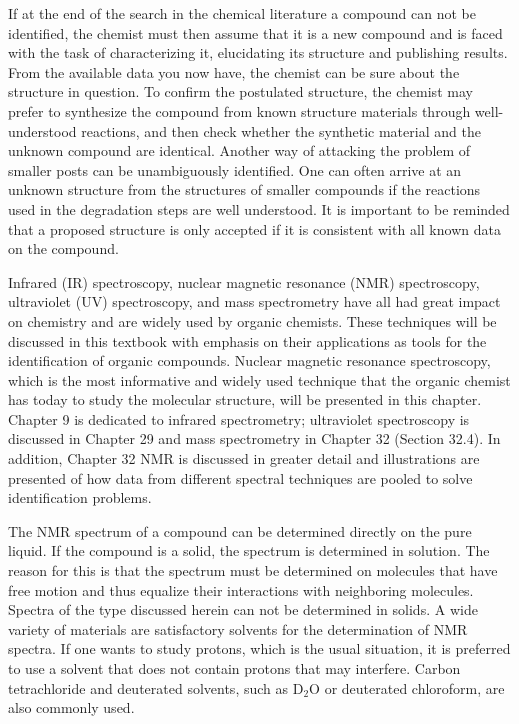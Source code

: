 If at the end of the search in the chemical literature a compound can not be identified, the chemist must then assume that it is a new compound and is faced with the task of characterizing it, elucidating its structure and publishing results. From the available data you now have, the chemist can be sure about the structure in question. To confirm the postulated structure, the chemist may prefer to synthesize the compound from known structure materials through well-understood reactions, and then check whether the synthetic material and the unknown compound are identical. Another way of attacking the problem of smaller posts can be unambiguously identified. One can often arrive at an unknown structure from the structures of smaller compounds if the reactions used in the degradation steps are well understood. It is important to be reminded that a proposed structure is only accepted if it is consistent with all known data on the compound.

Infrared (IR) spectroscopy, nuclear magnetic resonance (NMR) spectroscopy, ultraviolet (UV) spectroscopy, and mass spectrometry have all had great impact on chemistry and are widely used by organic chemists. These techniques will be discussed in this textbook with emphasis on their applications as tools for the identification of organic compounds. Nuclear magnetic resonance spectroscopy, which is the most informative and widely used technique that the organic chemist has today to study the molecular structure, will be presented in this chapter. Chapter 9 is dedicated to infrared spectrometry; ultraviolet spectroscopy is discussed in Chapter 29 and mass spectrometry in Chapter 32 (Section 32.4). In addition, Chapter 32 NMR is discussed in greater detail and illustrations are presented of how data from different spectral techniques are pooled to solve identification problems.

The NMR spectrum of a compound can be determined directly on the pure liquid. If the compound is a solid, the spectrum is determined in solution. The reason for this is that the spectrum must be determined on molecules that have free motion and thus equalize their interactions with neighboring molecules. Spectra of the type discussed herein can not be determined in solids. A wide variety of materials are satisfactory solvents for the determination of NMR spectra. If one wants to study protons, which is the usual situation, it is preferred to use a solvent that does not contain protons that may interfere. Carbon tetrachloride and deuterated solvents, such as D$_{2}$O or deuterated chloroform, are also commonly used.


